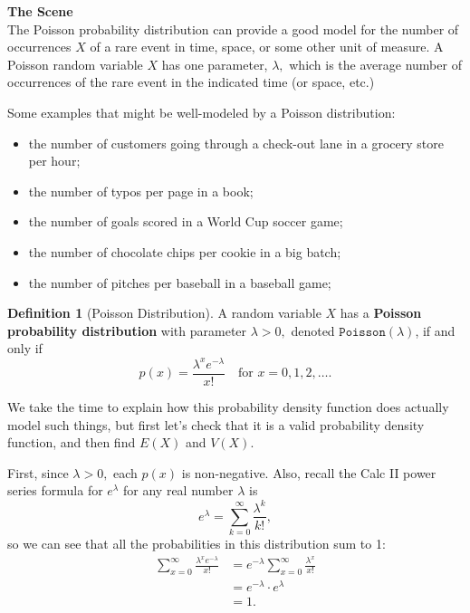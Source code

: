 \documentclass[
]{book}
\providecommand{\tightlist}{%
  \setlength{\itemsep}{0pt}\setlength{\parskip}{0pt}}
\theoremstyle{definition}
\newtheorem{definition}{Definition}[chapter]
\theoremstyle{definition}
\theoremstyle{definition}
\theoremstyle{definition}
\theoremstyle{remark}
\begin{document}
\textbf{The Scene}\\
The Poisson probability distribution can provide a good model for the number of occurrences \(X\) of a rare event in time, space, or some other unit of measure. A Poisson random variable \(X\) has one parameter, \(\lambda,\) which is the average number of occurrences of the rare event in the indicated time (or space, etc.)

Some examples that might be well-modeled by a Poisson distribution:

\begin{itemize}
\tightlist
\item
  the number of customers going through a check-out lane in a grocery store per hour;
\item
  the number of typos per page in a book;
\item
  the number of goals scored in a World Cup soccer game;
\item
  the number of chocolate chips per cookie in a big batch;
\item
  the number of pitches per baseball in a baseball game;
\end{itemize}

\begin{definition}[Poisson Distribution]
\protect\hypertarget{def:poisson-distribution}{}\label{def:poisson-distribution}A random variable \(X\) has a \textbf{Poisson probability distribution} with parameter \(\lambda > 0,\) denoted \(\texttt{Poisson}(\lambda)\), if and only if \[p(x) = \frac{\lambda^x e^{-\lambda}}{x!} ~~~\text{ for } x = 0,1,2, \ldots.\]
\end{definition}

We take the time to explain how this probability density function does actually model such things, but first let's check that it is a valid probability density function, and then find \(E(X)\) and \(V(X)\).

First, since \(\lambda > 0,\) each \(p(x)\) is non-negative. Also, recall the Calc II power series formula for \(e^\lambda\) for any real number \(\lambda\) is \[e^\lambda = \sum_{k=0}^\infty \frac{\lambda^k}{k!},\] so we can see that all the probabilities in this distribution sum to 1:
\begin{align*}
\sum_{x=0}^\infty \frac{\lambda^x e^{-\lambda}}{x!} &= e^{-\lambda} \sum_{x=0}^\infty \frac{\lambda^x}{x!} \\
&= e^{-\lambda}\cdot e^{\lambda} \\
&= 1.
\end{align*}
\end{document}
